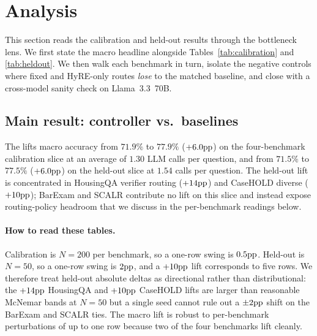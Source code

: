 \section{Analysis}\label{sec:analysis}

This section reads the calibration and held-out results through the
bottleneck lens. We first state the macro headline alongside
Tables~\ref{tab:calibration} and \ref{tab:heldout}. We then walk each
benchmark in turn, isolate the negative controls where fixed \hyre{} and
HyRE-only routes \emph{lose} to the matched baseline, and close with a
cross-model sanity check on Llama~3.3~70B.

\subsection{Main result: controller vs.\ baselines}

The \controller{} lifts macro accuracy from $71.9\%$ to $77.9\%$
($+6.0\mathrm{pp}$) on the four-benchmark calibration slice at an average
of $1.30$ LLM calls per question, and from $71.5\%$ to $77.5\%$
($+6.0\mathrm{pp}$) on the held-out slice at $1.54$ calls per question. The
held-out lift is concentrated in HousingQA verifier routing ($+14\mathrm{pp}$)
and CaseHOLD diverse \hyre{} ($+10\mathrm{pp}$); BarExam and SCALR contribute
no lift on this slice and instead expose routing-policy headroom that we
discuss in the per-benchmark readings below.

\paragraph{How to read these tables.} Calibration is $N{=}200$ per
benchmark, so a one-row swing is $0.5\mathrm{pp}$. Held-out is $N{=}50$, so a
one-row swing is $2\mathrm{pp}$, and a $+10\mathrm{pp}$ lift corresponds to five rows.
We therefore treat held-out absolute deltas as directional rather than
distributional: the $+14\mathrm{pp}$ HousingQA and $+10\mathrm{pp}$ CaseHOLD lifts are
larger than reasonable McNemar bands at $N{=}50$ but a single seed cannot
rule out a $\pm 2\mathrm{pp}$ shift on the BarExam and SCALR ties. The macro lift
is robust to per-benchmark perturbations of up to one row because two of
the four benchmarks lift cleanly.

